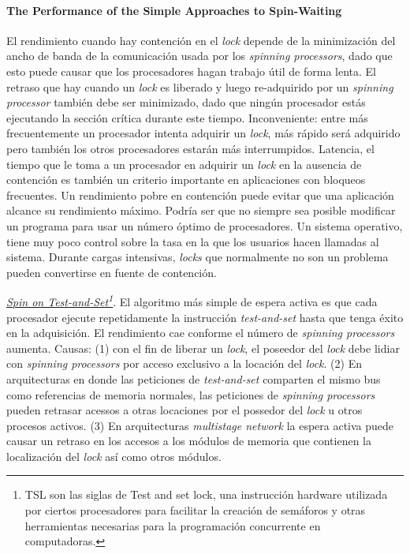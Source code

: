 \paragraph{\textnormal{\textbf{The Performance of the Simple Approaches to Spin-Waiting}}}
El rendimiento cuando hay contención en el \textit{lock} depende de la minimización del ancho de banda de la comunicación usada por los \textit{spinning processors}, dado que esto puede causar que los procesadores hagan trabajo útil de forma lenta. El retraso que hay cuando un \textit{lock} es liberado y luego re-adquirido por un \textit{spinning processor} también debe ser minimizado, dado que ningún procesador estás ejecutando la sección crítica durante este tiempo. Inconveniente: entre más frecuentemente un procesador intenta adquirir un \textit{lock}, más rápido será adquirido pero también los otros procesadores estarán más interrumpidos. Latencia, el tiempo que le toma a un procesador en adquirir un \textit{lock} en la ausencia de contención es también un criterio importante en aplicaciones con bloqueos frecuentes. Un rendimiento pobre en contención puede evitar que una aplicación alcance su rendimiento máximo. Podría ser que no siempre sea posible modificar un programa para usar un número óptimo de procesadores. Un sistema operativo, tiene muy poco control sobre la tasa en la que los usuarios hacen llamadas al sistema. Durante cargas intensivas, \textit{locks} que normalmente no son un problema pueden convertirse en fuente de contención. 

\underline{\textit{Spin on Test-and-Set\footnote{TSL son las siglas de Test and set lock, una instrucción hardware utilizada por ciertos procesadores para facilitar la creación de semáforos y otras herramientas necesarias para la programación concurrente en computadoras.}}}. El algoritmo más simple de espera activa es que cada procesador ejecute repetidamente la instrucción \textit{test-and-set} hasta que tenga éxito en la adquisición. El rendimiento cae conforme el número de \textit{spinning processors} aumenta. Causas: (1) con el fin de liberar un \textit{lock}, el poseedor del \textit{lock} debe lidiar con \textit{spinning processors} por acceso exclusivo a la locación del \textit{lock}. (2) En arquitecturas en donde las peticiones de \textit{test-and-set} comparten el mismo bus como referencias de memoria normales, las peticiones de \textit{spinning processors} pueden retrasar acessos a otras locaciones por el possedor del \textit{lock} u otros procesos activos. (3) En arquitecturas \textit{multistage network} la espera activa puede causar un retraso en los accesos a los módulos de memoria que contienen la localización del \textit{lock} así como otros módulos. 

